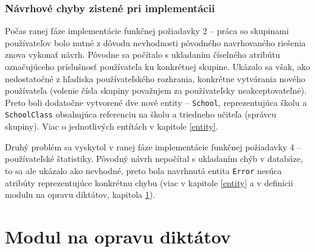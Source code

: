 \documentclass[12pt,oneside]{fithesis2}
\begin{document}
	 	\subsection{Návrhové chyby zistené pri implementácii}
	 \par Počas ranej fáze implementácie funkčnej požiadavky 2 -- práca so skupinami používateľov bolo nutné z dôvodu nevhodnosti pôvodného navrhovaného riešenia znova vykonať návrh. Pôvodne sa počítalo s ukladaním číselného atribútu označujúceho príslušnosť používateľa ku konkrétnej skupine. Ukázalo sa však, ako nedostatočné z hľadiska používateľského rozhrania, konkrétne vytvárania nového používateľa (volenie čísla skupiny považujem za používateľsky neakceptovateľné). Preto boli dodatočne vytvorené dve nové entity  -- \texttt{School}, reprezentujúca školu a \texttt{SchoolClass} obsahujúca referenciu na školu a triedneho učiteľa (správcu skupiny). Viac o jednotlivých entítách v kapitole \ref{entity}. 
	 \par Druhý problém sa vyskytol v ranej fáze implementácie funkčnej požiadavky 4 -- používateľské štatistiky. Pôvodný návrh nepočítal s ukladaním chýb v databáze, to sa ale ukázalo ako nevhodné, preto bola navrhnutá entita \texttt{Error} nesúca atribúty reprezentujúce konkrétnu chybu (viac v kapitole \ref{entity} a v definícii modulu na opravu diktátov, kapitola \ref{modul-diktaty}).

\chapter{Modul na opravu diktátov} \label{modul-diktaty}
\end{document}
